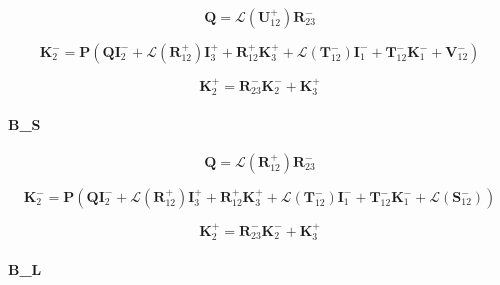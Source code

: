 \begin{equation}
\mathbf{Q} = \mathcal{L}(\mathbf{U}^{+}_{12})\mathbf{R}^{-}_{23}
\label{eq:radiance-boa_radiance-tangent_linear-b_u_P}
\end{equation}

\begin{equation}
\mathbf{K}^{-}_{2} = \mathbf{P}(\mathbf{Q}\mathbf{I}^{-}_{2} + \mathcal{L}(\mathbf{R}^{+}_{12})\mathbf{I}^{+}_{3} + \mathbf{R}^{+}_{12}\mathbf{K}^{+}_{3} + \mathcal{L}(\mathbf{T}^{-}_{12})\mathbf{I}^{-}_{1} + \mathbf{T}^{-}_{12}\mathbf{K}^{-}_{1} + \mathbf{V}^{-}_{12})
\label{eq:radiance-boa_radiance-tangent_linear-b_u_K_m_2}
\end{equation}

\begin{equation}
\mathbf{K}^{+}_{2} = \mathbf{R}^{-}_{23}\mathbf{K}^{-}_{2} + \mathbf{K}^{+}_{3}
\label{eq:radiance-boa_radiance-tangent_linear-b_u_K_p_2}
\end{equation}


\paragraph{B\_S}
\label{sec:radiance-boa_radiance-tangent_linear-b_s}

\begin{equation}
\mathbf{Q} = \mathcal{L}(\mathbf{R}^{+}_{12})\mathbf{R}^{-}_{23}
\label{eq:radiance-boa_radiance-tangent_linear-b_s_P}
\end{equation}

\begin{equation}
\mathbf{K}^{-}_{2} = \mathbf{P}(\mathbf{Q}\mathbf{I}^{-}_{2} + \mathcal{L}(\mathbf{R}^{+}_{12})\mathbf{I}^{+}_{3} + \mathbf{R}^{+}_{12}\mathbf{K}^{+}_{3} + \mathcal{L}(\mathbf{T}^{-}_{12})\mathbf{I}^{-}_{1} + \mathbf{T}^{-}_{12}\mathbf{K}^{-}_{1} + \mathcal{L}(\mathbf{S}^{-}_{12}))
\label{eq:radiance-boa_radiance-tangent_linear-b_s_K_m_2}
\end{equation}

\begin{equation}
\mathbf{K}^{+}_{2} = \mathbf{R}^{-}_{23}\mathbf{K}^{-}_{2} + \mathbf{K}^{+}_{3}
\label{eq:radiance-boa_radiance-tangent_linear-b_s_K_p_2}
\end{equation}


\paragraph{B\_L}
\label{sec:radiance-boa_radiance-tangent_linear-b_l}

